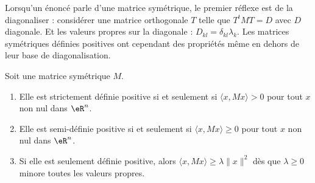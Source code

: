 Lorsqu'un énoncé parle d'une matrice symétrique, le premier réflexe est de la diagonaliser : considérer une matrice orthogonale \( T\) telle que \( T^tMT=D\) avec \( D\) diagonale. Et les valeurs propres sur la diagonale : \( D_{kl}=\delta_{kl}\lambda_k\). Les matrices symétriques définies positives ont cependant des propriétés même en dehors de leur base de diagonalisation.

\begin{lemma}   \label{LemWZFSooYvksjw}
    Soit une matrice symétrique \( M\).
    \begin{enumerate}
        \item       \label{ITEMooSKRAooOgHbGA}
           Elle est strictement définie positive si et seulement si \( \langle x, Mx\rangle >0\) pour tout \( x\) non nul dans \( \eR^n\).
        \item       \label{ITEMooMOZYooWcrewZ}
           Elle est semi-définie positive si et seulement si \( \langle x, Mx\rangle \geq 0\) pour tout \( x\) non nul dans \( \eR^n\).
       \item        \label{ITEMooRRMFooHSOHxZ}
           Si elle est seulement définie positive, alors \( \langle x, Mx\rangle \geq \lambda\| x \|^2\) dès que \( \lambda\geq 0\) minore toutes les valeurs propres.
    \end{enumerate}
\end{lemma}

